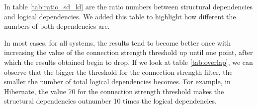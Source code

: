 \documentclass[runningheads]{comsis2}
\begin{document}
In table \ref{tab:ratio_sd_ld} are the ratio numbers between structural dependencies and logical dependencies. We added this table to highlight how different the numbers of both dependencies are.


\begin{table}[!h]
\setlength\tabcolsep{3pt}
\caption{Percentage of logical dependencies that are also structural dependencies}
\label{tab:overlap}
\centering
{}
\end{table}


\begin{table}[!h]
\setlength\tabcolsep{3.5pt}
\caption{Ratio between structural and logical dependencies (SD/LD)}
\label{tab:ratio_sd_ld}
\centering
{}
\end{table}

In most cases, for all systems, the results tend to become better once with increasing the value of the connection strength threshold up until one point, after which the results obtained begin to drop.
If we look at table \ref{tab:overlap}, we can observe that the bigger the threshold for the connection strength filter, the smaller the number of total logical dependencies becomes. For example, in Hibernate, the value 70 for the connection strength threshold makes the structural dependencies outnumber 10 times the logical dependencies. 
\end{document}
